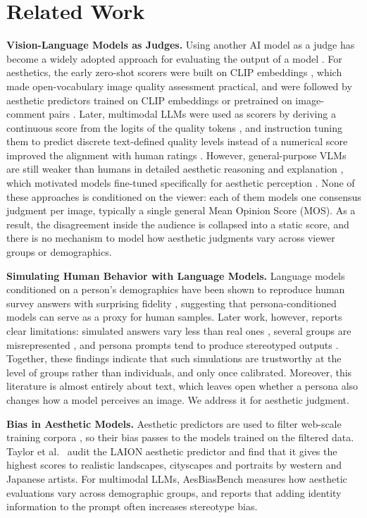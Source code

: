 \documentclass[runningheads]{llncs}
\begin{document}
\section{Related Work}


\textbf{Vision-Language Models as Judges.} Using another AI model as a judge has become a widely adopted approach for evaluating the output of a model \cite{zheng2023judging, liu2023geval}. For aesthetics, the early zero-shot scorers were built on CLIP embeddings \cite{wang2023clipiqa}, which made open-vocabulary image quality assessment practical, and were followed by aesthetic predictors trained on CLIP embeddings \cite{schuhmann2022} or pretrained on image-comment pairs \cite{ke2023vila}. Later, multimodal LLMs were used as scorers by deriving a continuous score from the logits of the quality tokens \cite{wu2024qbench}, and instruction tuning them to predict discrete text-defined quality levels instead of a numerical score improved the alignment with human ratings \cite{wu2024qalign}. However, general-purpose VLMs are still weaker than humans in detailed aesthetic reasoning and explanation \cite{huang2024aesbench, zhou2024uniaa}, which motivated models fine-tuned specifically for aesthetic perception \cite{zhou2024uniaa, huang2024aesexpert}. None of these approaches is conditioned on the viewer: each of them models one consensus judgment per image, typically a single general Mean Opinion Score (MOS). As a result, the disagreement inside the audience is collapsed into a static score, and there is no mechanism to model how aesthetic judgments vary across viewer groups or demographics.

\textbf{Simulating Human Behavior with Language Models.} Language models conditioned on a person's demographics have been shown to reproduce human survey answers with surprising fidelity \cite{argyle2023}, suggesting that persona-conditioned models can serve as a proxy for human samples. Later work, however, reports clear limitations: simulated answers vary less than real ones \cite{bisbee2024synthetic}, several groups are misrepresented \cite{santurkar2023whose}, and persona prompts tend to produce stereotyped outputs \cite{cheng2023compost}. Together, these findings indicate that such simulations are trustworthy at the level of groups rather than individuals, and only once calibrated. Moreover, this literature is almost entirely about text, which leaves open whether a persona also changes how a model perceives an image. We address it for aesthetic judgment.

\textbf{Bias in Aesthetic Models.} Aesthetic predictors are used to filter web-scale training corpora \cite{schuhmann2022}, so their bias passes to the models trained on the filtered data. Taylor et al.\ \cite{taylor2026gaze} audit the LAION aesthetic predictor and find that it gives the highest scores to realistic landscapes, cityscapes and portraits by western and Japanese artists. For multimodal LLMs, AesBiasBench \cite{aesbiasbench2025} measures how aesthetic evaluations vary across demographic groups, and reports that adding identity information to the prompt often increases stereotype bias. 
\end{document}
